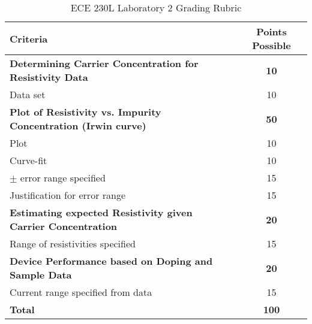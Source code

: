 \documentclass[12pt]{../manual}
\begin{document}
\newpage
{}
{}
\hspace{0pt}
\vfill
\begin{table}[ht!]
\caption{ECE 230L Laboratory 2 Grading Rubric}
\centering
\begin{tabular}{l|c} \hline
Criteria & Points Possible \\ \hline \hline
\textbf{Determining Carrier Concentration for Resistivity Data} & \textbf{10} \\ 
Data set & 10 \\ \hline
\textbf{Plot of Resistivity vs. Impurity Concentration (Irwin curve)} & \textbf{50} \\ 
            Plot & 10 \\ 
            Curve-fit & 10 \\ 
            $\pm$ error range specified & 15\\ 
              Justification for error range	& 15 \\ \hline
\textbf{Estimating expected Resistivity given Carrier Concentration} & \textbf{20} \\ 
Range of resistivities specified & 15 \\ \hline
\textbf{Device Performance based on Doping and Sample Data} & \textbf{20} \\ 
              Current range specified from data & 15 \\ \hline \hline
\textbf{Total}	& \textbf{100} \\ \hline
\end{tabular}
\end{table}
\vfill
%
\end{document}
